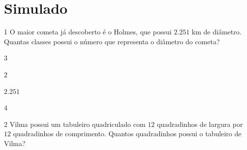
%




\setcounter{chapter}{0}
\chapter[Simulado 1]{Simulado}

\num{1}  O maior cometa já descoberto é o Holmes, que possui $2.251$ km de
diâmetro. Quantas classes possui o número que representa o diâmetro do cometa?

\begin{escolha}
\item $3$
\item $2$
\item $2.251$
\item $4$
\end{escolha}



\num{2}  Vilma possui um tabuleiro quadriculado com $12$ quadradinhos de largura
por $12$ quadradinhos de comprimento. Quantos quadradinhos possui o
tabuleiro de Vilma?

